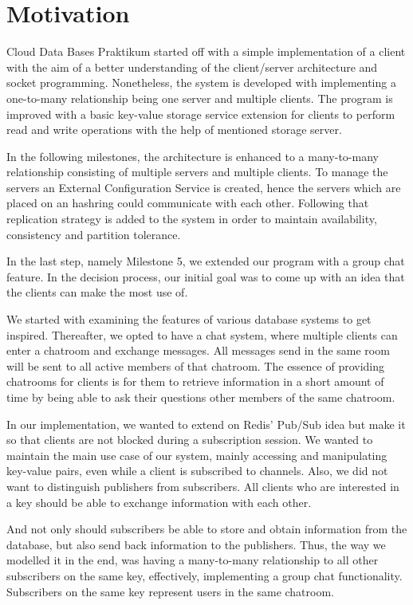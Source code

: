 \section{Motivation}
\label{sec:motivation}

Cloud Data Bases Praktikum started off with a simple implementation of a client with the aim of a better understanding of the client/server architecture and socket programming. Nonetheless, the system is developed with implementing a one-to-many relationship being one server and multiple clients. The program is improved with a basic key-value storage service extension for clients to perform read and write operations with the help of mentioned storage server. 

In the following milestones, the architecture is enhanced to a many-to-many relationship consisting of multiple servers and multiple clients. To manage the servers an External Configuration Service is created, hence the servers which are placed on an hashring could communicate with each other. Following that replication strategy is added to the system in order to maintain availability, consistency and partition tolerance. 

In the last step, namely Milestone 5, we extended our program with a group chat feature. In the decision process, our initial goal was to come up with an idea that the clients can make the most use of.

We started with examining the features of various database systems to get inspired. Thereafter, we opted to have a chat system, where multiple clients can enter a chatroom and exchange messages. All messages send in the same room will be sent to all active members of that chatroom. The essence of providing chatrooms for clients is for them to retrieve information in a short amount of time by being able to ask their questions other members of the same chatroom. 

In our implementation, we wanted to extend on Redis’ Pub/Sub
idea but make it so that clients are not blocked during a subscription session. We wanted to maintain the main use case of our system, mainly accessing and manipulating key-value pairs, even while a client is subscribed to channels. Also, we did not want to distinguish publishers from subscribers. All clients who are interested in a key should be able to exchange information with each other.

And not only should subscribers be able to store and obtain
information from the database, but also send back information
to the publishers. Thus, the way we modelled it in the end, was
having a many-to-many relationship to all other subscribers on
the same key, effectively, implementing a group chat functionality. Subscribers on the same key represent users in the same chatroom.

